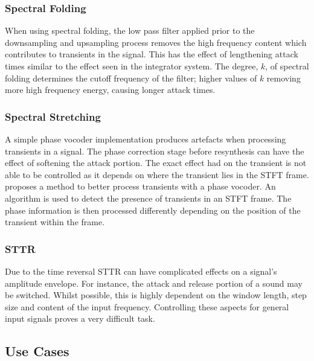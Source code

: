 		\subsubsection*{Spectral Folding}
			When using spectral folding, the low pass filter applied prior to the downsampling and upsampling
			process removes the high frequency content which contributes to transients in the signal. This has
			the effect of lengthening attack times similar to the effect seen in the integrator system. The
			degree, $k$, of spectral folding determines the cutoff frequency of the filter; higher values of
			$k$ removing more high frequency energy, causing longer attack times.

		\subsubsection*{Spectral Stretching}
			A simple phase vocoder implementation produces artefacts when processing transients in a signal.
			The phase correction stage before resynthesis can have the effect of softening the attack portion.
			The exact effect had on the transient is not able to be controlled as it depends on where the
			transient lies in the STFT frame. \citet{robel2003a} proposes a method to better process transients
			with a phase vocoder. An algorithm is used to detect the presence of transients in an STFT frame.
			The phase information is then processed differently depending on the position of the transient
			within the frame.

		\subsubsection*{STTR}
			Due to the time reversal STTR can have complicated effects on a signal's amplitude envelope.  For
			instance, the attack and release portion of a sound may be switched. Whilst possible, this is
			highly dependent on the window length, step size and content of the input frequency. Controlling
			these aspects for general input signals proves a very difficult task.

	\subsection{Use Cases}
	\label{sec:ExcitationEvaluation-Comparison-UseCases}
